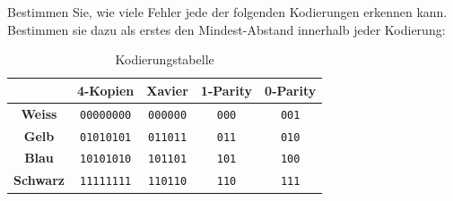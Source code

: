 \begin{myexercise}\label{ex:fehler-kodierungen}
Bestimmen Sie, wie viele Fehler jede der folgenden Kodierungen erkennen kann. Bestimmen sie dazu als erstes den Mindest-Abstand innerhalb jeder Kodierung:
\begin{table}[H]
    \centering
    \begin{tabular}{c|c|c|c|c}
        & \textbf{4-Kopien} & \textbf{Xavier} & \textbf{1-Parity} & \textbf{0-Parity} \\
        \midrule\midrule
        \textbf{Weiss} & \texttt{00000000} & \texttt{000000} & \texttt{000} & \texttt{001} \\
        \midrule
        \textbf{Gelb} & \texttt{01010101} & \texttt{011011} & \texttt{011} & \texttt{010} \\
        \midrule
        \textbf{Blau} & \texttt{10101010} & \texttt{101101} & \texttt{101} & \texttt{100} \\
        \midrule
        \textbf{Schwarz} & \texttt{11111111} & \texttt{110110} & \texttt{110} & \texttt{111} \\
    \end{tabular}
    \caption{Kodierungstabelle}
    \label{tab:kodierung}
\end{table}
\end{myexercise}
